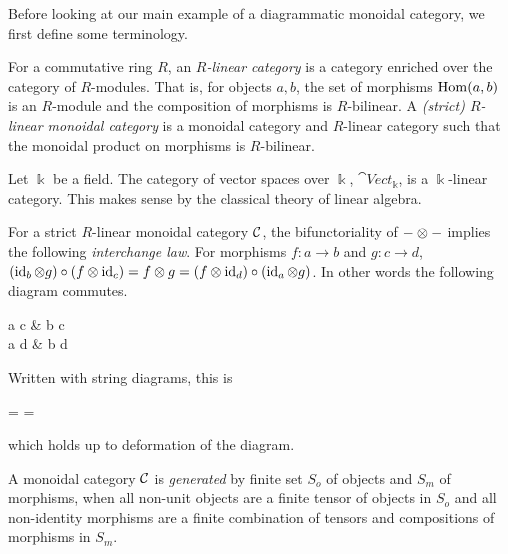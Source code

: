 Before looking at our main example of a diagrammatic monoidal category, we first define some terminology.

\begin{definition}
    For a commutative ring $R$, an \textit{$R$-linear category} is a category enriched over the category of $R$-modules. That is, for objects $a,b$, the set of morphisms $\operatorname{Hom}(a,b)$ is an $R$-module and the composition of morphisms is $R$-bilinear. A \textit{(strict) $R$-linear monoidal category} is a monoidal category and $R$-linear category such that the monoidal product on morphisms is $R$-bilinear. 
\end{definition}

\begin{example}
    Let $\Bbbk$ be a field. The category of vector spaces over $\Bbbk$, $\cat{Vect}_\Bbbk$, is a $\Bbbk$-linear category. This makes sense by the classical theory of linear algebra.
\end{example}

For a strict $R$-linear monoidal category $\mathcal{C}$,  the bifunctoriality of $- \otimes -$ implies the following \textit{interchange law}. For morphisms $f: a \to b$ and $g: c \to d$, $(\operatorname{id}_b \otimes g) \circ (f \otimes \operatorname{id}_c) = f \otimes g = (f \otimes \operatorname{id}_d) \circ (\operatorname{id}_a \otimes g)$. In other words the following diagram commutes.

\begin{center}
    \begin{mytikzcd}[sep=large]
        a \tensor c \arrow[r,"f \tensor \id_c"] \arrow[d, "\id_a \tensor g"'] \arrow[dr, "f \tensor g"]
        & b \tensor c \arrow[d, "\id_b \tensor g"] \\
        a \tensor d \arrow[r,"f \tensor \id_d"]
        & b \tensor d
    \end{mytikzcd}
\end{center}
Written with string diagrams, this is
\begin{center}
    = 
    = 
\end{center}
which holds up to deformation of the diagram.


\begin{definition}
    A monoidal category $\mathcal{C}$ is \textit{generated} by finite set $S_o$ of objects and $S_m$ of morphisms, when all non-unit objects are a finite tensor of objects in $S_o$ and all non-identity morphisms are a finite combination of tensors and compositions of morphisms in $S_m$.
\end{definition}

